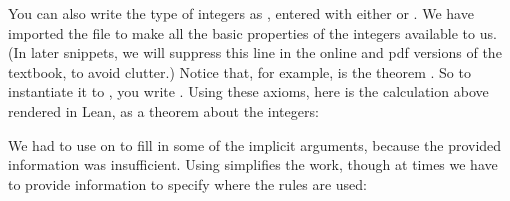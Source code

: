 \documentclass[letterpaper,10pt,english]{sphinxmanual}
\begin{document}
\sphinxAtStartPar
You can also write the type of integers as ,
entered with either  or .
We have imported the file 
to make all the basic properties of the integers available to us.
(In later snippets,
we will suppress this line in the online and pdf versions of the textbook,
to avoid clutter.)
Notice that, for example,
 is the theorem .
So to instantiate it to ,
you write .
Using these axioms,
here is the calculation above rendered in Lean, as a theorem about the integers:

\begin{sphinxVerbatim}[commandchars=\\\{\}]
                  
          
              
                             
              
\end{sphinxVerbatim}

\sphinxAtStartPar
We had to use  on  to fill in some of the implicit arguments,
because the provided information was insufficient.
Using  simplifies the work,
though at times we have to provide information to specify where the rules are used:
\end{document}
